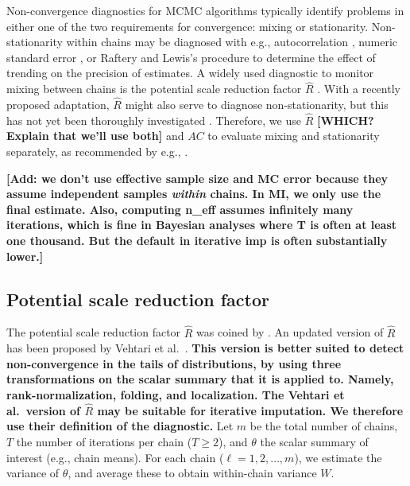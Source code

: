 \documentclass[Royal,times,sageh]{sagej}
\begin{document}
Non-convergence diagnostics for MCMC algorithms typically identify problems in either one of the two requirements for convergence: mixing or stationarity. Non-stationarity within chains may be diagnosed with e.g., autocorrelation \citep[\(AC\);][]{scha97, gelm13}, numeric standard error \citep[`MC error';][]{gewe92}, or Raftery and Lewis's \citeyearpar{raft91} procedure to determine the effect of trending on the precision of estimates. A widely used diagnostic to monitor mixing between chains is the potential scale reduction factor \(\widehat{R}\) \citep[`Gelman-Rubin statistic';][]{gelm92}. With a recently proposed adaptation, \(\widehat{R}\) might also serve to diagnose non-stationarity, but this has not yet been thoroughly investigated \citep{veht19}. Therefore, we use \(\widehat{R}\) \textbf{{[}WHICH? Explain that we'll use both{]}} and \(AC\) to evaluate mixing and stationarity separately, as recommended by e.g., \citet{cowl96}.

\textbf{{[}Add: we don't use effective sample size and MC error because they assume independent samples \emph{within} chains. In MI, we only use the final estimate. Also, computing n\_eff assumes infinitely many iterations, which is fine in Bayesian analyses where T is often at least one thousand. But the default in iterative imp is often substantially lower.{]}}

\hypertarget{potential-scale-reduction-factor}{%
\subsection{Potential scale reduction factor}\label{potential-scale-reduction-factor}}

The potential scale reduction factor \(\widehat{R}\) was coined by \citet{gelm92}. An updated version of \(\widehat{R}\) has been proposed by Vehtari et al.~\citeyearpar[p.~5]{veht19}. \textbf{This version is better suited to detect non-convergence in the tails of distributions, by using three transformations on the scalar summary that it is applied to. Namely, rank-normalization, folding, and localization. The Vehtari et al.~version of \(\widehat{R}\) may be suitable for iterative imputation. We therefore use their definition of the diagnostic.} Let \(m\) be the total number of chains, \(T\) the number of iterations per chain (\(T\geq2\)), and \(\theta\) the scalar summary of interest (e.g., chain means). For each chain (\(\ell = 1, 2, \dots, m\)), we estimate the variance of \(\theta\), and average these to obtain within-chain variance \(W\).
\end{document}
